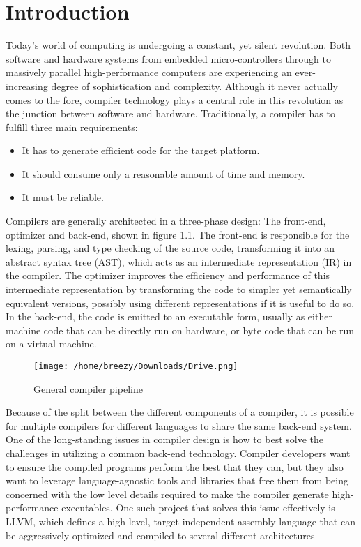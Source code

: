 \documentclass[openany]{book}
\begin{document}
\chapter{Introduction}
   \Large
   Today's world of computing is undergoing a constant, yet silent revolution. Both
   software and hardware systems from embedded micro-controllers through to massively
   parallel high-performance computers are experiencing an ever-increasing degree of
   sophistication and complexity. Although it never actually comes to the fore, compiler
   technology plays a central role in this revolution as the junction between software and
   hardware. Traditionally, a compiler has to fulfill three main requirements:
   \begin{itemize}
   	\item It has to generate efficient code for the target platform.
   	\item It should consume only a reasonable amount of time and memory.
   	\item It must be reliable.
   \end{itemize}

Compilers are generally architected in a three-phase design: The front-end, optimizer
and back-end, shown in figure 1.1. The front-end is responsible for the lexing, parsing, and
type checking of the source code, transforming it into an abstract syntax tree (AST), which
acts as an intermediate representation (IR) in the compiler. The optimizer improves the
efficiency and performance of this intermediate representation by transforming the code to
simpler yet semantically equivalent versions, possibly using different representations if it
is useful to do so. In the back-end, the code is emitted to an executable form, usually as
either machine code that can be directly run on hardware, or byte code that can be run on a
virtual machine.\linebreak \linebreak 
\begin{figure}
	\texttt{[image: /home/breezy/Downloads/Drive.png]}
	\caption{General compiler pipeline}
	\label{fig:1.1}
\end{figure} Because of the split between the different components of a compiler, it is possible for
multiple compilers for different languages to share the same back-end system. One of the
long-standing issues in compiler design is how to best solve the challenges in utilizing a
common back-end technology. Compiler developers want to ensure the compiled programs
perform the best that they can, but they also want to leverage language-agnostic tools and
libraries that free them from being concerned with the low level details required to make the compiler generate high-performance executables.  One such project that solves this issue
effectively is LLVM, which defines a high-level, target independent assembly language
that can be aggressively optimized and compiled to several different architectures 
\end{document}
